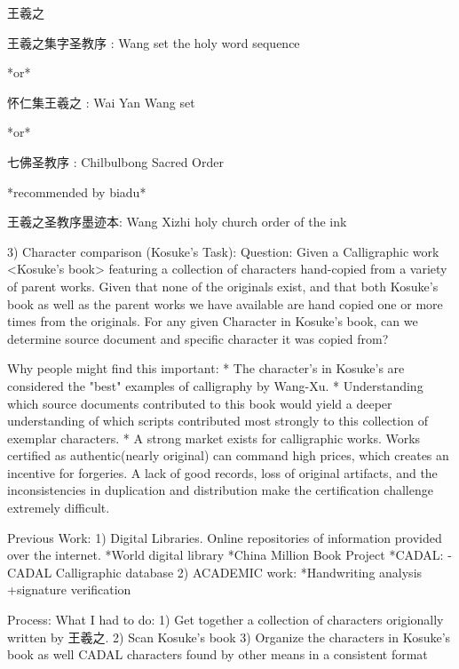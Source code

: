 王羲之

王羲之集字圣教序 : Wang set the holy word sequence

*or*

怀仁集王羲之 : Wai Yan Wang set

*or*

七佛圣教序 : Chilbulbong Sacred Order

*recommended by biadu*

王羲之圣教序墨迹本: Wang Xizhi holy church order of the ink








3)  Character comparison (Kosuke's Task):
    Question:   Given a Calligraphic work <Kosuke's book> featuring a collection of characters hand-copied from a variety of parent works.
                Given that none of the originals exist, and that both Kosuke's book as well as the parent works we have available are hand copied one or more times from the originals.
                For any given Character in Kosuke's book, can we determine source document and specific character it was copied from?
                
Why people might find this important:
    *  The character's in Kosuke's are considered the "best" examples of calligraphy by Wang-Xu.
    *  Understanding which source documents contributed to this book would yield a deeper understanding of which scripts contributed most strongly to this collection of exemplar characters.
    *  A strong market exists for calligraphic works.  Works certified as authentic(nearly original) can command high prices, which creates an incentive for forgeries.  A lack of good records, loss of original artifacts, and the inconsistencies in duplication and distribution make the certification challenge extremely difficult.
    
Previous Work:
    1) Digital Libraries.  Online repositories of information provided over the internet.
        *World digital library
        *China Million Book Project
            *CADAL:
                -CADAL Calligraphic database
    2) ACADEMIC work:
        *Handwriting analysis
            +signature verification
            

Process:  What I had to do:
    1)  Get together a collection of characters origionally written by 王羲之.
    2)  Scan Kosuke's book
    3)  Organize the characters in Kosuke's book as well CADAL characters found by other means in a consistent format
    

